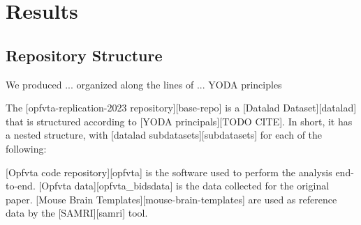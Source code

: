\section{Results}


\subsection{Repository Structure}
We produced ... organized along the lines of ... YODA principles

The [opfvta-replication-2023 repository][base-repo] is a [Datalad
Dataset][datalad] that is structured according to [YODA principals][TODO
CITE]. In short, it has a nested structure, with [datalad
subdatasets][subdatasets] for each of the following:

[Opfvta code repository][opfvta] is the software used to perform the analysis end-to-end.
[Opfvta data][opfvta_bidsdata] is the data collected for the original
paper.
[Mouse Brain Templates][mouse-brain-templates] are used as reference
data by the [SAMRI][samri] tool. 


